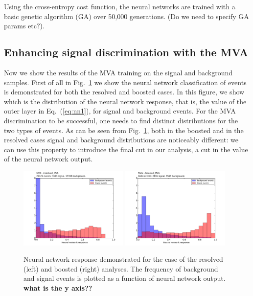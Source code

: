 Using the cross-entropy cost function, the neural networks are trained with a basic genetic algorithm (GA) over 50,000 generations.
(Do we need to specify GA params etc?).
\subsection{Enhancing signal discrimination with the MVA}

Now we show the results of the MVA training on the signal and
background samples.
%
First of all in Fig.~\ref{fig:nnresponse} we show
the neural network classification of events is demonstrated for both the resolved and boosted cases.
%
In this figure, we show which is the distribution of the neural network
response, that is, the value of the outer layer in Eq.~(\ref{eq:nn1}),
for signal and background events.
%
For the MVA discrimination to be successful, one needs to find
distinct distributions for the two types of events.
%
As can be seen from  Fig.~\ref{fig:nnresponse}, both
in the boosted and in the resolved cases signal and background
distributions are noticeably different: we can use this property
to introduce the final cut in our analysis, a cut in the value
of the neural network output.

\begin{figure}[t]
\begin{center}
\includegraphics[width=0.48\textwidth]{plots/resolved_MVA_hist.pdf}
\includegraphics[width=0.48\textwidth]{plots/boosted_MVA_hist.pdf}
\caption{\small Neural network response demonstrated for the case of the resolved (left) and boosted (right) analyses. The frequency of background and signal events is plotted as a function of neural network output.
{\bf what is the y axis??}
}
\label{fig:nnresponse}
\end{center}
\end{figure}

